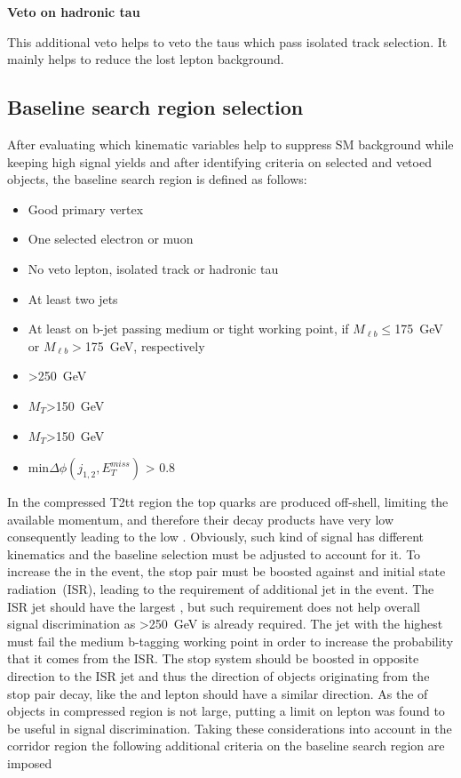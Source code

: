 \textbf{Veto on hadronic tau}

This additional veto helps to veto the taus which pass isolated track selection. It mainly helps to reduce the lost lepton background.

\subsection{Baseline search region selection~\label{sec:baseline}}

After evaluating which kinematic variables help to suppress SM background while keeping high signal yields and after identifying criteria on selected and vetoed objects, the baseline search region is defined as follows:

\begin{itemize}

\item Good primary vertex
\item One selected electron or muon
\item No veto lepton, isolated track or hadronic tau
\item At least two jets
\item At least on b-jet passing medium or tight working point, if $M_{\ell b} \leq$175~GeV or $M_{\ell b}>$175~GeV, respectively
\item \MET>250~GeV
\item $M_{T}$>150~GeV
\item $M_{T}$>150~GeV
\item min$\Delta \phi (j_{1,2}, E_{T}^{miss})$ > 0.8

\end{itemize}

In the compressed T2tt region the top quarks are produced off-shell, limiting the available momentum,  and therefore their decay products have very low \pt consequently leading to the low \MET. Obviously, such kind of signal has different kinematics and the baseline selection must be adjusted to account for it. To increase the \MET in the event, the stop pair must be boosted against and initial state radiation~(ISR), leading to the requirement of additional jet in the event. The ISR jet should have the largest \pt, but such requirement does not help overall signal discrimination as \MET>250~GeV is already required. The jet with the highest \pt must fail the medium b-tagging working point in order to increase the probability that it comes from the ISR. The stop system should be boosted in opposite direction to the ISR jet and thus the direction of objects originating from the stop pair decay, like the \MET and lepton should have a similar direction. As the \pt of objects in compressed region is not large, putting a limit on lepton \pt was found to be useful in signal discrimination. Taking these considerations into account in the corridor region the following additional criteria on the baseline search region are imposed

